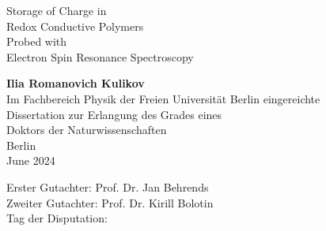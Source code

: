 \documentclass[12pt, twoside, a4paper]{book}
\begin{document}
\thispagestyle{empty}
\begin{center}
\begin{huge}
Storage of Charge in\\
Redox Conductive Polymers\\
Probed with\\
Electron Spin Resonance Spectroscopy\\
\end{huge}
\vspace{7\baselineskip}
\textbf{Ilia Romanovich Kulikov}\\
\vspace{7\baselineskip}
Im Fachbereich Physik der Freien Universit\"{a}t Berlin eingereichte\\
Dissertation zur Erlangung des Grades eines\\
Doktors der Naturwissenschaften\\
\vspace{13\baselineskip}
Berlin\\
June 2024\\




\end{center}
\newpage
\vspace{36\baselineskip}

\hspace*{\fill} Erster Gutachter: Prof. Dr. Jan Behrends\\
\hspace*{\fill} Zweiter Gutachter: Prof. Dr. Kirill Bolotin\\
\hspace*{\fill} Tag der Disputation: \\

\newpage
\tableofcontents
\newpage

%



%


%


%
%
%








\end{document}

